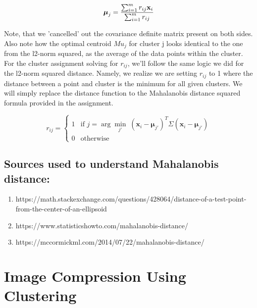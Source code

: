 \documentclass{article}
\begin{document}
\begin{enumerate}
\begin{equation}
\begin{equation}
\boldsymbol{\mu}_j = \frac{\sum_{i=1}^{m} r_{ij} \mathbf{x}_i}{\sum_{i=1}^{m} r_{ij}}
\end{equation}

Note, that we 'cancelled' out the covariance definite matrix present on both sides. Also note how the
optimal centroid $Mu_j$ for cluster j looks identical to the one from the l2-norm squared, as the average
of the data points within the cluster. For the cluster assignment solving for $r_{ij}$, we'll follow the same
logic we did for the l2-norm squared distance. Namely, we realize we are setting $r_{ij}$ to 1 where
the distance between a point and cluster is the minimum for all given clusters. We will simply replace
the distance function to the Mahalanobis distance squared formula provided in the assignment.

\begin{equation}
r_{ij} = \begin{cases}
1 & \text{if } j = \arg \min_{j'} \; (\mathbf{x}_i - \boldsymbol{\mu}_{j'})^T \Sigma (\mathbf{x}_i - \boldsymbol{\mu}_{j'}) \\
0 & \text{otherwise}
\end{cases}
\end{equation}


\subsection*{Sources used to understand Mahalanobis distance:}
\begin{enumerate}
\item https://math.stackexchange.com/questions/428064/distance-of-a-test-point-from-the-center-of-an-ellipsoid
\item https://www.statisticshowto.com/mahalanobis-distance/
\item https://mccormickml.com/2014/07/22/mahalanobis-distance/
\end{enumerate}
\end{enumerate}

\section{Image Compression Using Clustering}
\end{document}

